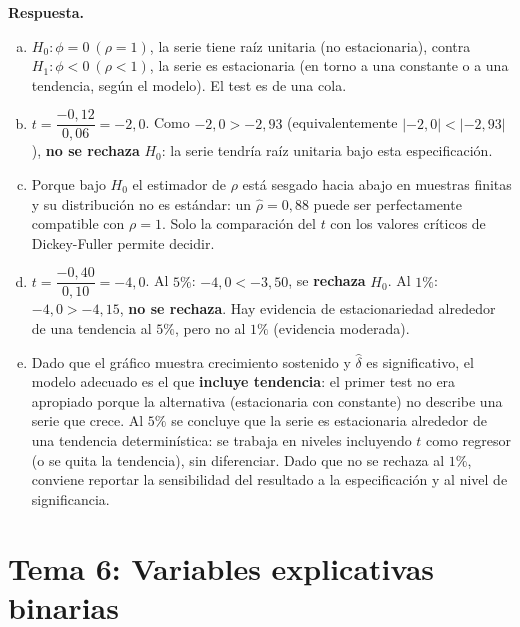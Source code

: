\documentclass[12pt,letterpaper]{article}
\newenvironment{resp}{\begingroup\color{blue}\par\noindent\textbf{Respuesta.}\ }{\par\endgroup}
\newcommand{\tema}[1]{\section*{#1}}
\begin{document}
\begin{enumerate}[1.]
\begin{resp}
\begin{enumerate}[a)]
\item $H_0:\phi=0\ (\rho=1)$, la serie tiene raíz unitaria (no estacionaria), contra $H_1:\phi<0\ (\rho<1)$, la serie es estacionaria (en torno a una constante o a una tendencia, según el modelo). El test es de una cola.
\item $t=\dfrac{-0{,}12}{0{,}06}=-2{,}0$. Como $-2{,}0>-2{,}93$ (equivalentemente $|-2{,}0|<|-2{,}93|$), \textbf{no se rechaza} $H_0$: la serie tendría raíz unitaria bajo esta especificación.
\item Porque bajo $H_0$ el estimador de $\rho$ está sesgado hacia abajo en muestras finitas y su distribución no es estándar: un $\hat\rho=0{,}88$ puede ser perfectamente compatible con $\rho=1$. Solo la comparación del $t$ con los valores críticos de Dickey-Fuller permite decidir.
\item $t=\dfrac{-0{,}40}{0{,}10}=-4{,}0$. Al $5\%$: $-4{,}0<-3{,}50$, se \textbf{rechaza} $H_0$. Al $1\%$: $-4{,}0>-4{,}15$, \textbf{no se rechaza}. Hay evidencia de estacionariedad alrededor de una tendencia al $5\%$, pero no al $1\%$ (evidencia moderada).
\item Dado que el gráfico muestra crecimiento sostenido y $\hat\delta$ es significativo, el modelo adecuado es el que \textbf{incluye tendencia}: el primer test no era apropiado porque la alternativa (estacionaria con constante) no describe una serie que crece. Al $5\%$ se concluye que la serie es estacionaria alrededor de una tendencia determinística: se trabaja en niveles incluyendo $t$ como regresor (o se quita la tendencia), sin diferenciar. Dado que no se rechaza al $1\%$, conviene reportar la sensibilidad del resultado a la especificación y al nivel de significancia.
\end{enumerate}
\end{resp}
\end{enumerate}

\newpage
\tema{Tema 6: Variables explicativas binarias}
\end{document}
